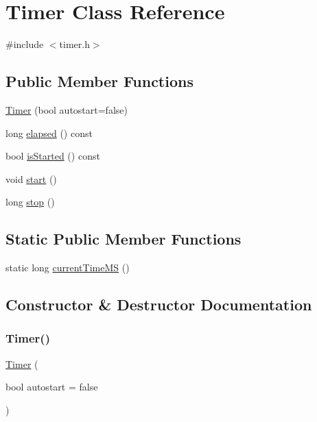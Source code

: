 \hypertarget{classTimer}{}\section{Timer Class Reference}
\label{classTimer}


{\ttfamily \#include $<$timer.\+h$>$}

\subsection*{Public Member Functions}
\begin{DoxyCompactItemize}
\item 
\mbox{\hyperlink{classTimer_a706556016b105bfe8459770ee1540dd9}{Timer}} (bool autostart=false)
\item 
long \mbox{\hyperlink{classTimer_a4c3fc68815831690cadc2f7cc65890fb}{elapsed}} () const
\item 
bool \mbox{\hyperlink{classTimer_ac1991ea0e286fbb461b60c8c9299d781}{is\+Started}} () const
\item 
void \mbox{\hyperlink{classTimer_a60de64d75454385b23995437f1d72669}{start}} ()
\item 
long \mbox{\hyperlink{classTimer_aeaafdf74a35ee2a5308e0b421f87b6a5}{stop}} ()
\end{DoxyCompactItemize}
\subsection*{Static Public Member Functions}
\begin{DoxyCompactItemize}
\item 
static long \mbox{\hyperlink{classTimer_a15da52f140db2287f84e933d49314a11}{current\+Time\+MS}} ()
\end{DoxyCompactItemize}


\subsection{Constructor \& Destructor Documentation}
\mbox{\label{classTimer_a706556016b105bfe8459770ee1540dd9}} 
\subsubsection{\texorpdfstring{Timer()}{Timer()}}
{\footnotesize\ttfamily \mbox{\hyperlink{classTimer}{Timer}} (\begin{DoxyParamCaption}\item[{bool}]{autostart = {\ttfamily false} }\end{DoxyParamCaption})}



